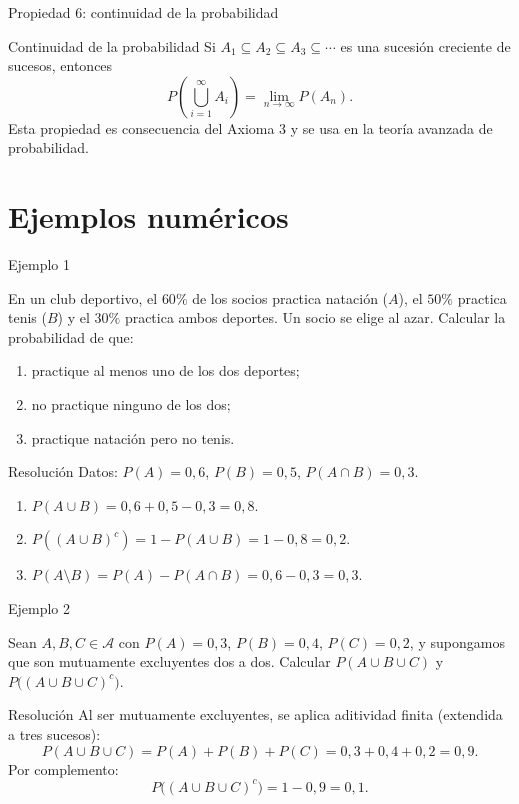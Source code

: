 \documentclass[aspectratio=169,11pt]{beamer}
\begin{document}
\begin{frame}{Propiedad 6: continuidad de la probabilidad}
\begin{block}{Continuidad de la probabilidad}
Si $A_1 \subseteq A_2 \subseteq A_3 \subseteq \cdots$ es una sucesión creciente de sucesos, entonces
\[
P\left(\bigcup_{i=1}^{\infty} A_i\right) = \lim_{n\to\infty} P(A_n).
\]
Esta propiedad es consecuencia del Axioma 3 y se usa en la teoría avanzada de probabilidad.
\end{block}
\end{frame}

\section{Ejemplos numéricos}

\begin{frame}{Ejemplo 1}
\begin{example}
En un club deportivo, el $60\%$ de los socios practica natación ($A$), el $50\%$ practica tenis ($B$) y el $30\%$ practica ambos deportes. Un socio se elige al azar. Calcular la probabilidad de que:
\begin{enumerate}
\item practique al menos uno de los dos deportes;
\item no practique ninguno de los dos;
\item practique natación pero no tenis.
\end{enumerate}
\end{example}
\begin{block}{Resolución}
Datos: $P(A)=0{,}6$, $P(B)=0{,}5$, $P(A\cap B)=0{,}3$.
\begin{enumerate}
\item $P(A\cup B) = 0{,}6+0{,}5-0{,}3 = 0{,}8$.
\item $P((A\cup B)^c) = 1-P(A\cup B) = 1-0{,}8 = 0{,}2$.
\item $P(A\setminus B) = P(A)-P(A\cap B) = 0{,}6-0{,}3 = 0{,}3$.
\end{enumerate}
\end{block}
\end{frame}

\begin{frame}{Ejemplo 2}
\begin{example}
Sean $A,B,C\in\mathcal{A}$ con $P(A)=0{,}3$, $P(B)=0{,}4$, $P(C)=0{,}2$, y supongamos que son mutuamente excluyentes dos a dos. Calcular $P(A\cup B\cup C)$ y $P\big((A\cup B\cup C)^c\big)$.
\end{example}
\begin{block}{Resolución}
Al ser mutuamente excluyentes, se aplica aditividad finita (extendida a tres sucesos):
\[
P(A\cup B\cup C) = P(A)+P(B)+P(C) = 0{,}3+0{,}4+0{,}2 = 0{,}9.
\]
Por complemento:
\[
P\big((A\cup B\cup C)^c\big) = 1 - 0{,}9 = 0{,}1.
\]
\end{block}
\end{frame}
\end{document}
